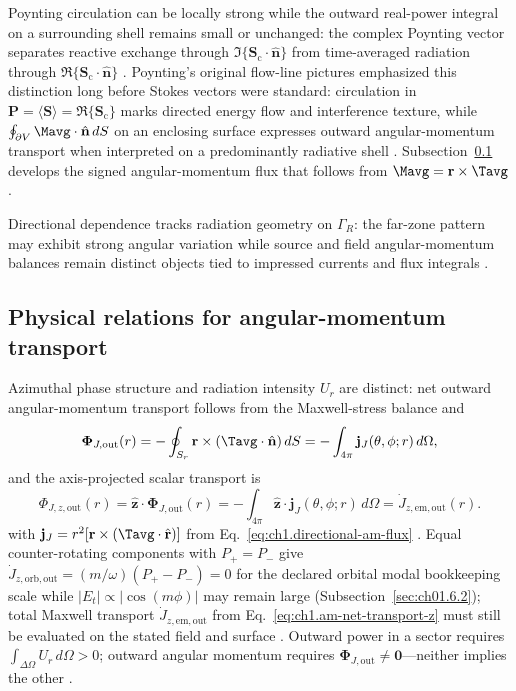 Poynting circulation can be locally strong while the outward real-power integral on a surrounding shell remains small or unchanged: the complex Poynting vector separates reactive exchange through $\Im\{\mathbf{S}_\mathrm{c}\cdot\hat{\mathbf{n}}\}$ from time-averaged radiation through $\Re\{\mathbf{S}_\mathrm{c}\cdot\hat{\mathbf{n}}\}$ \cite{poynting1884}. Poynting's original flow-line pictures \cite{poynting1884} emphasized this
distinction long before Stokes vectors were standard: circulation in $\mathbf{P}=\langle\mathbf{S}\rangle=\Re\{\mathbf{S}_\mathrm{c}\}$ marks directed energy flow and interference texture, while $\oint_{\partial V}\Mavg\cdot\hat{\mathbf{n}}\,dS$ on an enclosing surface expresses outward angular-momentum transport when interpreted on a predominantly radiative shell \cite{poynting1884,beth1936}. Subsection~\ref{sec:ch01.2.3} develops the signed angular-momentum flux that follows from $\Mavg=\mathbf{r}\times\Tavg$ \cite{stratton1941}.

Directional dependence tracks radiation geometry on $\Gamma_R$: the far-zone pattern may exhibit strong angular variation while source and field angular-momentum balances remain distinct objects tied to impressed currents and flux integrals \cite{belinfante1940}.
\subsection{Physical relations for angular-momentum transport}
\label{sec:ch01.2.3}

Azimuthal phase structure and radiation intensity $U_r$ are distinct: net outward angular-momentum transport follows from the Maxwell-stress balance and
\begin{equation}
\label{eq:ch1.am-net-transport-condition}
\boldsymbol{\Phi}_{J,\mathrm{out}}(r)=-\oint_{S_r}\mathbf{r}\times(\Tavg\cdot\hat{\mathbf{n}})\,dS
=-\int_{4\pi}\mathbf{j}_J(\theta,\phi;r)\,d\Omega,
\end{equation}
and the axis-projected scalar transport is
\begin{equation}
\label{eq:ch1.am-net-transport-z}
\Phi_{J,z,\mathrm{out}}(r)=\hat{\mathbf{z}}\cdot\boldsymbol{\Phi}_{J,\mathrm{out}}(r)
=-\int_{4\pi}\hat{\mathbf{z}}\cdot\mathbf{j}_J(\theta,\phi;r)\,d\Omega
=\dot J_{z,\mathrm{em,out}}(r).
\end{equation}
with $\mathbf{j}_J=r^2[\mathbf{r}\times(\Tavg\cdot\hat{\mathbf{r}})]$ from Eq.~\eqref{eq:ch1.directional-am-flux} \cite{stratton1941,beth1936}. Equal counter-rotating components with $P_+=P_-$ give $\dot J_{z,\mathrm{orb,out}}=(m/\omega)(P_+-P_-)=0$ for the declared orbital modal bookkeeping scale while $|E_t|\propto|\cos(m\phi)|$ may remain large (Subsection~\ref{sec:ch01.6.2}); total Maxwell transport $\dot J_{z,\mathrm{em,out}}$ from Eq.~\eqref{eq:ch1.am-net-transport-z} must still be evaluated on the stated field and surface \cite{allen1992,stratton1941}. Outward power in a sector requires $\int_{\Delta\Omega}U_r\,d\Omega>0$; outward angular momentum requires $\boldsymbol{\Phi}_{J,\mathrm{out}}\neq\mathbf{0}$---neither implies the other \cite{poynting1884}.
\label{eq:ch1.flux-qualified-decision}%
\label{eq:ch1.transport-charge-continuous-index}%
\label{tab:ch1.triad-numeric-dipole}

